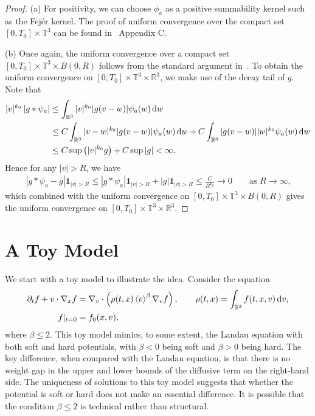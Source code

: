 \documentclass[11pt,american, reqno]{amsart}
\numberwithin{equation}{section}
\newcommand{\R}{\mathbb R}
\newcommand{\1}{\mathds{1}}
\newcommand{\Ni}{\noindent}
\newcommand{\del}{\partial}
\newcommand{\dv}{\, {\rm d} v}
\newcommand{\dw}{\, {\rm d} w}
\newcommand{\One}{{\boldsymbol 1}}
\newcommand{\vpran}[1]{\left(#1\right)}
\newcommand{\nn}{\nonumber}
\newcommand{\abs}[1]{\left\vert#1\right\vert}
\newcommand{\vint}[1]{\left\langle#1\right\rangle}
\newcommand{\T}{\mathbb{T}}
\numberwithin{equation}{section}
\begin{document}
\begin{proof}
(a) For positivity, we can choose $\phi_a$ as a positive summability kernel such as the Fej\'er kernel. The proof of uniform convergence over the compact set $[0, T_0] \times \T^3$ can be found in~\cite{Evans} Appendix C. 

\Ni (b) Once again, the uniform convergence over a compact set $[0, T_0] \times \T^3 \times B(0, R)$ follows from the standard argument in~\cite{Evans}. To obtain the uniform convergence on $[0, T_0] \times \T^3 \times \R^3$, we make use of the decay tail of $g$. Note that 
\begin{align*}
  |v|^{k_0} \abs{g \ast \psi_a}
&\leq 
 \int_{\R^3} |v|^{k_0} |g(v-w)| \psi_a(w) \dw
\\
&\leq
 C \int_{\R^3} |v - w|^{k_0} |g(v-w)| \psi_a(w) \dw
 + C  \int_{\R^3}  |g(v-w)| |w|^{k_0} \psi_a(w) \dw
\\
&\leq 
C\sup\vpran{|v|^{k_0} g} 
+ C \sup |g|
< \infty.
\end{align*}
Hence for any $|v| > R$, we have
\begin{align*}
 \abs{g \ast \psi_a - g} \One_{|v| > R}
\leq
 \abs{g \ast \psi_a} \One_{|v| > R}
 + \abs{g} \One_{|v| > R}
\leq  
 \frac{C}{R^{k_0}} \to 0
\qquad
\text{as $R \to \infty$,}
\end{align*}
which combined with the uniform convergence on $[0, T_0] \times \T^3 \times B(0, R)$ gives the uniform convergence on $[0, T_0] \times \T^3 \times \R^3$.
\end{proof}



\section{A Toy Model}\label{Sec:toy}
We start with a toy model to illustrate the idea. Consider the equation
\begin{align} \label{eq:toy-original}
 \del_t f + v \cdot \nabla_x f 
&= \nabla_v \cdot \vpran{\rho(t, x) \vint{v}^\beta \nabla_v f}, 
\qquad
  \rho(t, x) =  \int_{\R^3} f(t, x, v) \dv, 
\\
 f|_{t=0} & = f_0 (x, v),  \nn
\end{align}
where $\beta \leq 2$. This toy model mimics, to some extent, the Landau equation with both soft and hard potentials, with $\beta < 0$ being soft and $\beta > 0$ being hard. The key difference, when compared with the Landau equation, is that there is no weight gap in the upper and lower bounds of the diffusive term on the right-hand side. The uniqueness of solutions to this toy model suggests that whether the potential is soft or hard does not make an essential difference. It is possible that the condition $\beta \leq 2$ is technical rather than structural. 
\end{document}
